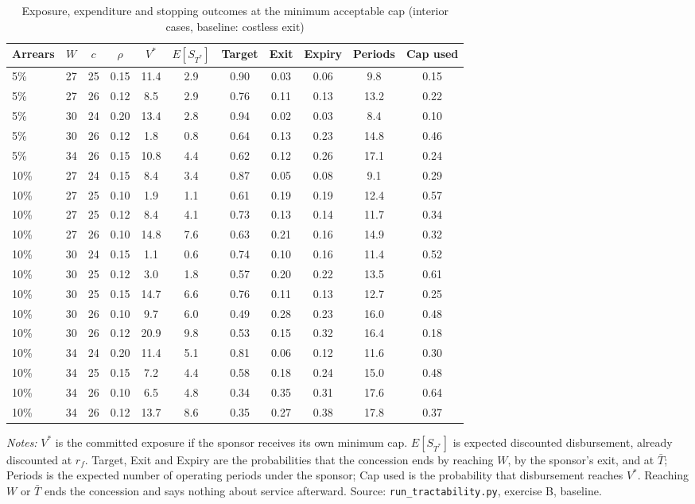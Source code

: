 \begin{table}[htbp]\centering\small
\caption{Exposure, expenditure and stopping outcomes at the minimum acceptable cap (interior cases, baseline: costless exit)}\label{tab:c1C}
\begin{threeparttable}\begin{tabular}{lcccccccccc}\toprule
Arrears & $W$ & $c$ & $\rho$ & $V^*$ & $E[S_{T^*}]$ & Target & Exit & Expiry & Periods & Cap used\\\midrule
5\% & 27 & 25 & 0.15 & 11.4 & 2.9 & 0.90 & 0.03 & 0.06 & 9.8 & 0.15\\
5\% & 27 & 26 & 0.12 & 8.5 & 2.9 & 0.76 & 0.11 & 0.13 & 13.2 & 0.22\\
5\% & 30 & 24 & 0.20 & 13.4 & 2.8 & 0.94 & 0.02 & 0.03 & 8.4 & 0.10\\
5\% & 30 & 26 & 0.12 & 1.8 & 0.8 & 0.64 & 0.13 & 0.23 & 14.8 & 0.46\\
5\% & 34 & 26 & 0.15 & 10.8 & 4.4 & 0.62 & 0.12 & 0.26 & 17.1 & 0.24\\
10\% & 27 & 24 & 0.15 & 8.4 & 3.4 & 0.87 & 0.05 & 0.08 & 9.1 & 0.29\\
10\% & 27 & 25 & 0.10 & 1.9 & 1.1 & 0.61 & 0.19 & 0.19 & 12.4 & 0.57\\
10\% & 27 & 25 & 0.12 & 8.4 & 4.1 & 0.73 & 0.13 & 0.14 & 11.7 & 0.34\\
10\% & 27 & 26 & 0.10 & 14.8 & 7.6 & 0.63 & 0.21 & 0.16 & 14.9 & 0.32\\
10\% & 30 & 24 & 0.15 & 1.1 & 0.6 & 0.74 & 0.10 & 0.16 & 11.4 & 0.52\\
10\% & 30 & 25 & 0.12 & 3.0 & 1.8 & 0.57 & 0.20 & 0.22 & 13.5 & 0.61\\
10\% & 30 & 25 & 0.15 & 14.7 & 6.6 & 0.76 & 0.11 & 0.13 & 12.7 & 0.25\\
10\% & 30 & 26 & 0.10 & 9.7 & 6.0 & 0.49 & 0.28 & 0.23 & 16.0 & 0.48\\
10\% & 30 & 26 & 0.12 & 20.9 & 9.8 & 0.53 & 0.15 & 0.32 & 16.4 & 0.18\\
10\% & 34 & 24 & 0.20 & 11.4 & 5.1 & 0.81 & 0.06 & 0.12 & 11.6 & 0.30\\
10\% & 34 & 25 & 0.15 & 7.2 & 4.4 & 0.58 & 0.18 & 0.24 & 15.0 & 0.48\\
10\% & 34 & 26 & 0.10 & 6.5 & 4.8 & 0.34 & 0.35 & 0.31 & 17.6 & 0.64\\
10\% & 34 & 26 & 0.12 & 13.7 & 8.6 & 0.35 & 0.27 & 0.38 & 17.8 & 0.37\\
\bottomrule\end{tabular}
\begin{tablenotes}\footnotesize\item \textit{Notes:} $V^*$ is the committed exposure if the sponsor receives its own minimum cap. $E[S_{T^*}]$ is expected discounted disbursement, already discounted at $r_f$. Target, Exit and Expiry are the probabilities that the concession ends by reaching $W$, by the sponsor's exit, and at $\bar T$; Periods is the expected number of operating periods under the sponsor; Cap used is the probability that disbursement reaches $V^*$. Reaching $W$ or $\bar T$ ends the concession and says nothing about service afterward. Source: \texttt{run\_tractability.py}, exercise B, baseline.\end{tablenotes}

\end{threeparttable}
\end{table}
